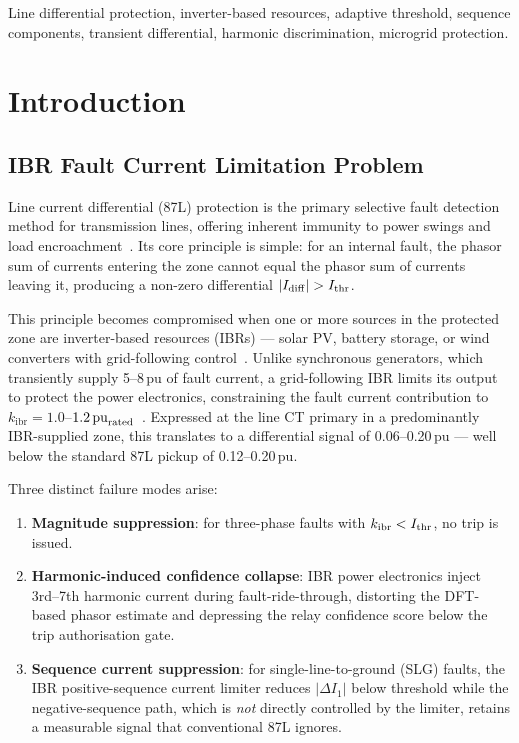 \documentclass[journal,twoside,10pt]{IEEEtran}
\newcommand{\Idiff}{I_{\mathrm{diff}}}
\newcommand{\kibr}{k_{\mathrm{ibr}}}
\begin{document}
\begin{IEEEkeywords}
Line differential protection, inverter-based resources, adaptive threshold,
sequence components, transient differential, harmonic discrimination,
microgrid protection.
\end{IEEEkeywords}

\section{Introduction}
\label{sec:intro}

\subsection{IBR Fault Current Limitation Problem}

Line current differential (87L) protection is the primary selective fault
detection method for transmission lines, offering inherent immunity to
power swings and load encroachment~\cite{Blackburn2006,IEEE_C37_243}.
Its core principle is simple: for an internal fault, the phasor sum of
currents entering the zone cannot equal the phasor sum of currents leaving
it, producing a non-zero differential $|\Idiff| > I_{\rm thr}$.

This principle becomes compromised when one or more sources in the protected
zone are inverter-based resources (IBRs) --- solar PV, battery storage, or
wind converters with grid-following control~\cite{Plet2011,Hooshyar2019}.
Unlike synchronous generators, which transiently supply 5--8\,pu of fault
current, a grid-following IBR limits its output to protect the power
electronics, constraining the fault current contribution to
$\kibr = 1.0$--$1.2\,\text{pu}_{\rm rated}$~\cite{Plet2011}.
Expressed at the line CT primary in a predominantly IBR-supplied zone, this
translates to a differential signal of 0.06--0.20\,pu --- well below the
standard 87L pickup of 0.12--0.20\,pu.

Three distinct failure modes arise:
\begin{enumerate}
  \item \textbf{Magnitude suppression}: for three-phase faults with
        $\kibr < I_{\rm thr}$, no trip is issued.
  \item \textbf{Harmonic-induced confidence collapse}: IBR power electronics
        inject 3rd--7th harmonic current during fault-ride-through, distorting
        the DFT-based phasor estimate and depressing the relay confidence
        score below the trip authorisation gate.
  \item \textbf{Sequence current suppression}: for single-line-to-ground (SLG)
        faults, the IBR positive-sequence current limiter reduces
        $|\Delta I_1|$ below threshold while the negative-sequence path,
        which is \emph{not} directly controlled by the limiter, retains a
        measurable signal that conventional 87L ignores.
\end{enumerate}
\end{document}
